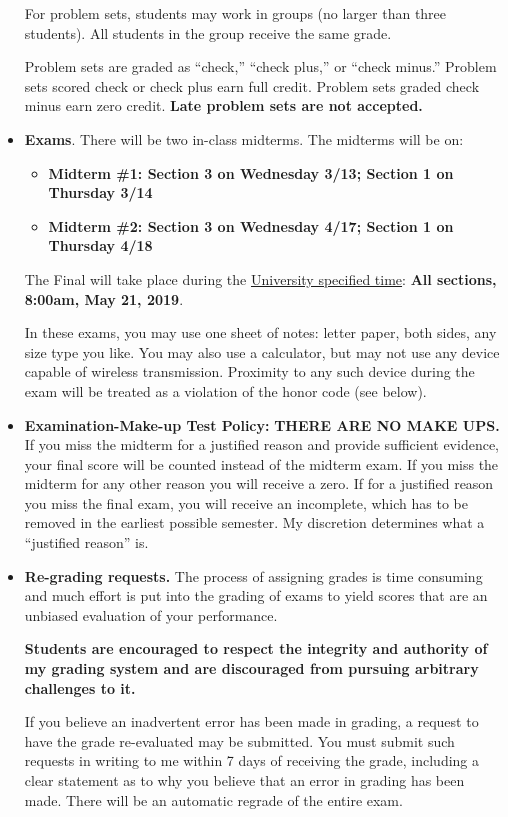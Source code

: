 \documentclass[12pt,pdftex,twoside,letterpaper]{exam}
\begin{document}
\begin{itemize}
    For problem sets, students may work in groups (no larger than three students). All students in the group receive the same grade.

    Problem sets are graded as ``check,'' ``check plus,'' or ``check minus.'' Problem sets scored check or check plus earn full credit. Problem sets graded check minus earn zero credit. \textbf{Late problem sets are not accepted.}

\item \textbf{Exams}. There will be two in-class midterms. The midterms will be on:
\begin{itemize}
\item\textbf{Midterm \#1: Section 3 on Wednesday 3/13; Section 1 on Thursday 3/14}
\item\textbf{Midterm \#2: Section 3 on Wednesday 4/17; Section 1 on Thursday 4/18}
\end{itemize}
The Final will take place during the \href{http://www.nyu.edu/registrar/pdf/Final_exam_schedule_Spring_2019.pdf}{University specified time}: \textbf{All sections, 8:00am, May 21, 2019}.

In these exams, you may use one sheet of notes: letter paper, both sides, any size type you like. You may also use a calculator, but may not use any device capable of wireless transmission.  Proximity to any such device during the exam will be treated as a violation of the honor code (see below).

\item \textbf{Examination-Make-up Test Policy:} \textbf{THERE ARE NO MAKE UPS.}\\

If you miss the midterm for a justified reason and provide sufficient evidence, your final score will be counted instead of the midterm exam. If you miss the midterm for any other reason you will receive a zero. If for a justified reason you miss the final exam, you will receive an incomplete, which has to be removed in the earliest possible semester. My discretion determines what a ``justified reason'' is.

\item \textbf{Re-grading requests.} The process of assigning grades is time consuming and much effort is put into the grading of exams to yield scores that are an unbiased evaluation of your performance.

    \textbf{Students are encouraged to respect the integrity and authority of my grading system and are discouraged from pursuing arbitrary challenges to it.}

If you believe an inadvertent error has been made in grading, a request to have the grade re-evaluated may be submitted. You must submit such requests in writing to me within 7 days of receiving the grade, including a clear statement as to why you believe that an error in grading has been made. There will be an automatic regrade of the entire exam.

\end{itemize}
\end{document}
